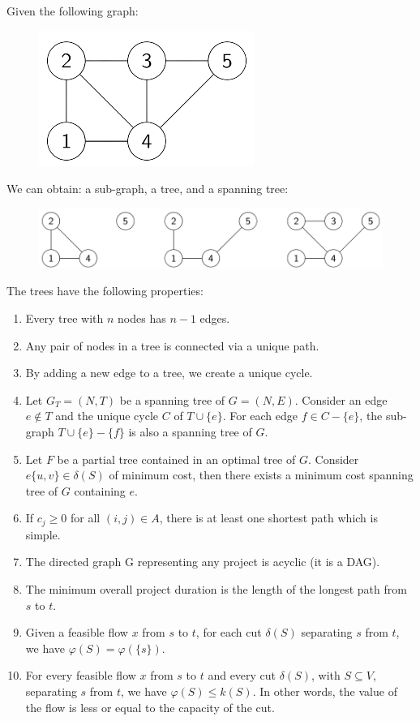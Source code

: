 \documentclass[12pt, a4paper]{report}
\begin{document}
    \begin{example}
        Given the following graph: 
        \begin{figure}[H]
            \centering
            \includegraphics[width=0.3\linewidth]{images/sgraph.png}
        \end{figure}
        We can obtain: a sub-graph, a tree, and a spanning tree: 
        \begin{figure}[H]
            \centering
            \includegraphics[width=0.8\linewidth]{images/sgraphmod.png}
        \end{figure}
    \end{example}
    The trees have the following properties: 
    \begin{enumerate}
        \item Every tree with $n$ nodes has $n-1$ edges. 
        \item Any pair of nodes in a tree is connected via a unique path. 
        \item By adding a new edge to a tree, we create a unique cycle. 
        \item Let $G_T=(N,T)$ be a spanning tree of $G=(N,E)$. Consider an edge $e \notin T$ and the unique cycle $C$ of $T \cup \{e\}$. For each edge $f \in C-\{e\}$, the 
            sub-graph $T\cup \{e\}-\{f\}$ is also a spanning tree of $G$. 
        \item Let $F$ be a partial tree contained in an optimal tree of $G$. Consider $e\{u,v\}\in \delta(S)$ of minimum cost, then there exists a minimum cost spanning tree of 
            $G$ containing $e$. 
        \item If $c_j \geq 0$ for all $(i,j) \in A$, there is at least one shortest path which is simple. 
        \item The directed graph G representing any project is acyclic (it is a DAG). 
        \item The minimum overall project duration is the length of the longest path from $s$ to $t$. 
        \item Given a feasible flow $x$ from $s$ to $t$, for each cut $\delta(S)$ separating $s$ from $t$, we have $\varphi(S)=\varphi(\{s\})$.
        \item For every feasible flow $x$ from $s$ to $t$ and every cut $\delta(S)$, with $S \subseteq V$, separating $s$ from $t$, we have $\varphi(S) \leq k(S)$. In other words,
            the value of the flow is less or equal to the capacity of the cut. 
    \end{enumerate}
\end{document}
